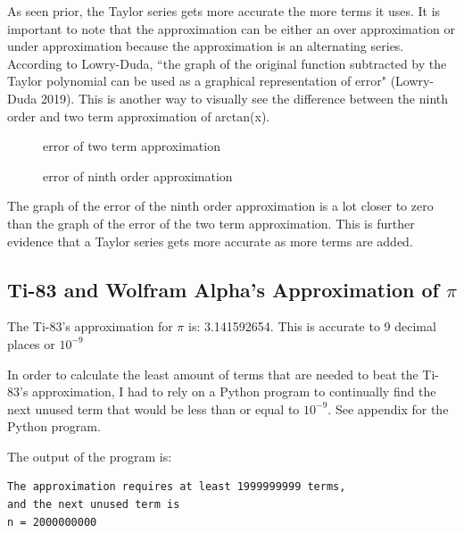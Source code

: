 \documentclass[12pt, titlepage]{article}
\begin{document}
As seen prior, the Taylor series gets more accurate the more terms it uses. It is important to note that the approximation can be either an over approximation or under approximation because the approximation is an alternating series. According to Lowry-Duda, ``the graph of the original function subtracted by the Taylor polynomial can be used as a graphical representation of error" (Lowry-Duda 2019). This is another way to visually see the difference between the ninth order and two term approximation of arctan(x). 

\begin{figure}[H]
\centering
    \caption[]{error of two term approximation}
\end{figure}

\begin{figure}[H]
\centering
    \caption[]{error of ninth order approximation}
\end{figure}

The graph of the error of the ninth order approximation is a lot closer to zero than the graph of the error of the two term approximation. This is further evidence that a Taylor series gets more accurate as more terms are added.

\subsection{Ti-83 and Wolfram Alpha's Approximation of \(\pi\)}
The Ti-83's approximation for \(\pi\) is: 3.141592654. This is accurate to 9 decimal places or \(10^{-9}\)

In order to calculate the least amount of terms that are needed to beat the Ti-83's approximation, I had to rely on a Python program to continually find the next unused term that would be less than or equal to \(10^{-9}\). See appendix for the Python program.

The output of the program is:
\begin{verbatim}
The approximation requires at least 1999999999 terms, 
and the next unused term is 
n = 2000000000
\end{verbatim}
\end{document}

